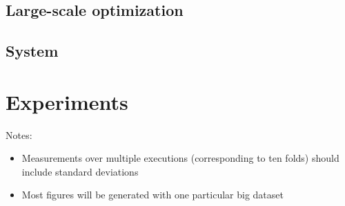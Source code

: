 \subsection{Large-scale optimization}

\subsection{System}

\section{Experiments}

Notes:
\begin{itemize}

\item Measurements over multiple executions (corresponding to ten folds)
should include standard deviations

\item Most figures will be generated with one particular big dataset
\end{itemize}


